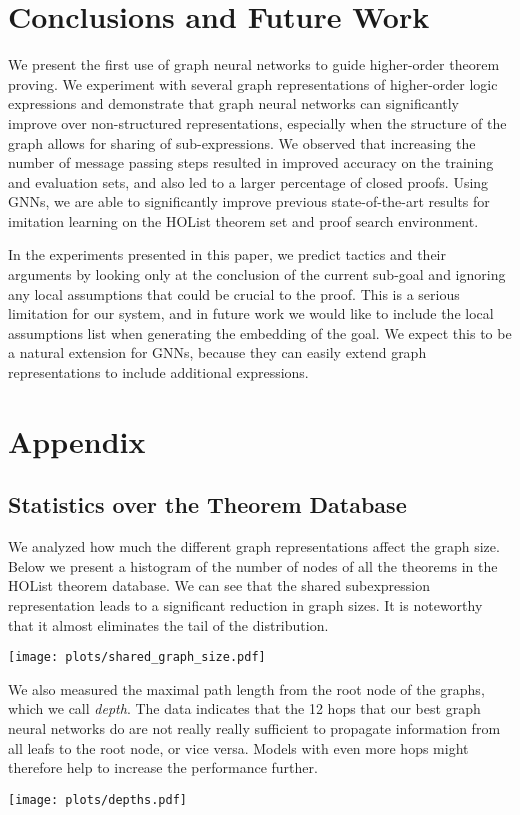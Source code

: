 \documentclass[letterpaper]{article} \usepackage{aaai20}  \usepackage{times}  \usepackage{helvet} \usepackage{courier}  \usepackage[hyphens]{url}  \usepackage{graphicx} \urlstyle{rm} \def\UrlFont{\rm}  \usepackage{graphicx}  \frenchspacing  \setlength{\pdfpagewidth}{8.5in}  \setlength{\pdfpageheight}{11in}
\begin{document}
 \section{Conclusions and Future Work}
\label{sec:conclusion}

We present the first use of graph neural networks to guide higher-order theorem proving. We experiment with several graph representations of higher-order logic expressions and demonstrate that graph neural networks can significantly improve over non-structured representations, especially when the structure of the graph allows for sharing of sub-expressions. 
We observed that increasing the number of message passing steps resulted in improved accuracy on the training and evaluation sets, and also led to a larger percentage of closed proofs.
Using GNNs, we are able to significantly improve previous state-of-the-art results for imitation learning on the HOList theorem set and proof search environment.

In the experiments presented in this paper, we predict tactics and their arguments by looking only at the conclusion of the current sub-goal and ignoring any local assumptions that could be crucial to the proof.
This is a serious limitation for our system, and in future work we would like to include the local assumptions list when generating the embedding of the goal.
We expect this to be a natural extension for GNNs, because they can easily extend graph representations to include additional expressions.
 





\clearpage
\appendix
\section{Appendix}


\subsection{Statistics over the Theorem Database}
\label{sec:graph-stats}

We analyzed how much the different graph representations affect the graph size. 
Below we present a histogram of the number of nodes of all the theorems in the HOList theorem database. We can see that the shared subexpression representation leads to a significant reduction in graph sizes. It is noteworthy that it almost eliminates the tail of the distribution.

\texttt{[image: plots/shared\_graph\_size.pdf]}

We also measured the maximal path length from the root node of the graphs, which we call \emph{depth}.
The data indicates that the 12 hops that our best graph neural networks do are not really really sufficient to propagate information from all leafs to the root node, or vice versa.
Models with even more hops might therefore help to increase the performance further.

\texttt{[image: plots/depths.pdf]} 
\end{document}
